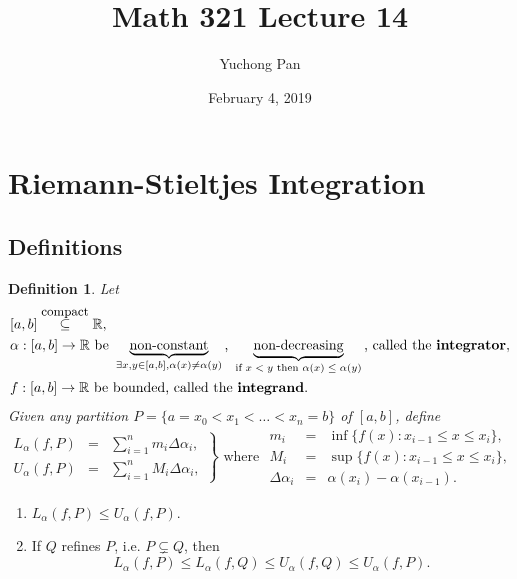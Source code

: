 \documentclass[letterpaper, reqno,11pt]{article}
\newcommand{\RR}{\mathbb{R}}
\begin{document}
\title{Math 321 Lecture 14}
\author{Yuchong Pan}
\date{February 4, 2019}
\newtheorem{thm}{Theorem}
\newtheorem{defn}{Definition}
\newtheorem*{remark}{Remark}
\newtheorem{claim}{Claim}
\newtheorem{cor}{Corollary}
\newtheorem{lemma}{Lemma}
\newtheorem{prop}{Proposition}
\maketitle
%

\section{Riemann-Stieltjes Integration}

\subsection{Definitions}

\begin{defn}
  \normalfont Let
  \begin{align*}
    & [a, b] \overset{\text{\small compact}}{\subseteq} \RR, \\
    & \alpha : [a, b] \to \RR \text{ be } \underbrace{\text{non-constant}}_{\exists x, y \in [a, b], \alpha(x) \neq \alpha(y)} \text{, } \underbrace{\text{non-decreasing}}_{\text{if $x < y$ then $\alpha(x) \leq \alpha(y)$}} \text{, called the {\bf integrator}}, \\
    & f : [a, b] \to \RR \text{ be bounded, called the {\bf integrand}}.
  \end{align*}
  Given any partition $P = \{ a = x_0 < x_1 < \ldots < x_n = b \}$ of $[a, b]$, define
  $$ \left.
  \begin{array}{lcl}
    L_\alpha(f, P) &=& \sum_{i = 1}^n m_i \Delta \alpha_i, \\
    U_\alpha(f, P) &=& \sum_{i = 1}^n M_i \Delta \alpha_i,
  \end{array}
  \right\}
  \text{ where }
  \begin{array}{lcl}
    m_i &=& \inf \{ f(x) : x_{i - 1} \leq x \leq x_i \}, \\
    M_i &=& \sup \{ f(x) : x_{i - 1} \leq x \leq x_i \}, \\
    \Delta \alpha_i &=& \alpha(x_i) - \alpha(x_{i - 1}).
  \end{array}
  $$
\end{defn}

\begin{enumerate}
\item $L_\alpha(f, P) \leq U_\alpha(f, P)$.
\item If $Q$ refines $P$, i.e. $P \subsetneq Q$, then
  \begin{equation} \label{eq:*} \tag{*}
    L_\alpha(f, P) \leq L_\alpha(f, Q) \leq U_\alpha(f, Q) \leq U_\alpha(f, P).
  \end{equation}
\end{enumerate}
\end{document}
